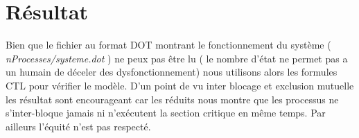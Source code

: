 \documentclass[a4paper]{report}
\begin{document}
\section{Résultat}
Bien que le fichier au format DOT montrant le fonctionnement du système ( \textit{ nProcesses/systeme.dot} ) ne peux pas être lu ( le nombre d'état ne permet pas a un humain de déceler des dysfonctionnement) nous utilisons alors les formules CTL pour  vérifier le modèle.
D'un point de vu inter blocage et exclusion mutuelle les résultat sont encourageant car les réduits nous montre que les processus ne s'inter-bloque jamais ni n'exécutent la section critique en même temps. Par ailleurs l'équité n'est pas respecté.
\end{document}
